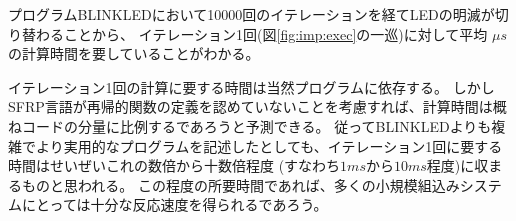プログラムBLINKLEDにおいて10000回のイテレーションを経てLEDの明滅が切り替わることから、
イテレーション1回(図\ref{fig:imp:exec}の一巡)に対して平均
$  \mu s$
の計算時間を要していることがわかる。

イテレーション1回の計算に要する時間は当然プログラムに依存する。
しかしSFRP言語が再帰的関数の定義を認めていないことを考慮すれば、計算時間は概ねコードの分量に比例するであろうと予測できる。
従ってBLINKLEDよりも複雑でより実用的なプログラムを記述したとしても、イテレーション1回に要する時間はせいぜいこれの数倍から十数倍程度
(すなわち$1ms$から$10ms$程度)に収まるものと思われる。
この程度の所要時間であれば、多くの小規模組込みシステムにとっては十分な反応速度を得られるであろう。
